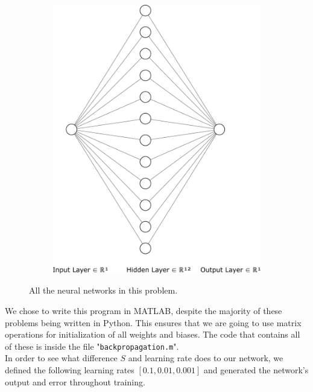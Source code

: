 \begin{figure}[htbp]
\begin{subfigure}{0.47\textwidth}
		\includegraphics[width=\textwidth]{../Problem 4/nn_1_12_1.pdf}
		\caption{}
	\end{subfigure}
	\caption{All the neural networks in this problem.}
	\label{fig:prob4_nns}
\end{figure}

We chose to write this program in MATLAB, despite the majority of these problems being written in Python. This ensures that we are going to use matrix operations for initialization of all weights and biases. The code that contains all of these is inside the file "\verb*|backpropagation.m|".\\

In order to see what difference $S$ and learning rate does to our network, we defined the following learning rates $\left[0.1, 0.01, 0.001\right]$ and generated the network's output and error throughout training.
